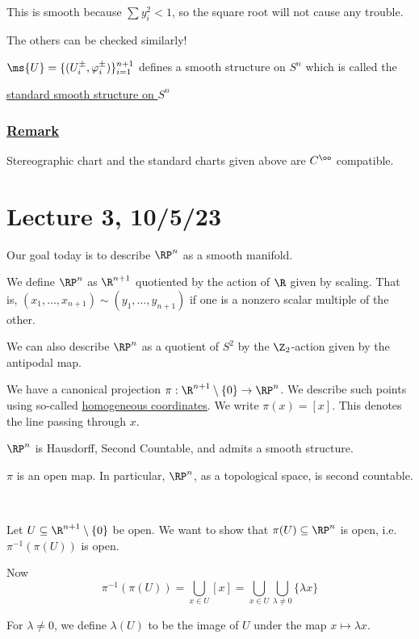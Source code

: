 \documentclass[x11names,reqno,14pt]{extarticle}
\renewcommand{\phi}{\varphi}
\begin{document}
This is smooth because $\sum y_i^2 < 1$, so the square root will not cause any trouble. 

The others can be checked similarly! 

$\ms{U} = \{(U_i^\pm, \phi_i^\pm)\}_{i=1}^{n + 1}$ defines a smooth structure on $S^n$ which is called the 

\underline{standard smooth structure on $S^n$}

\subsubsection*{\underline{Remark}}


Stereographic chart and the standard charts given above are $C^\oo$ compatible. 

\section*{Lecture 3, 10/5/23}

Our goal today is to describe $\RP^n$ as a smooth manifold. 


We define $\RP^n$ as $\R^{n + 1}$ quotiented by the action of $\R$ given by scaling. That is, $(x_1, \dots, x_{n + 1}) \sim (y_1, \dots, y_{n + 1})$ if one is a nonzero scalar multiple of the other. 

We can also describe $\RP^n$ as a quotient of $S^2$ by the $\Z_2$-action given by the antipodal map. 

We have a canonical projection $\pi:\R^{n + 1}\setminus\{0\}\to \RP^n$. We describe such points using so-called \underline{homogeneous coordinates}. We write $\pi(x) = [x]$. This denotes the line passing through $x$. 

\claim $\RP^n$ is Hausdorff, Second Countable, and admits a smooth structure. 

\lem 

$\pi$ is an open map. In particular, $\RP^n$, as a topological space, is second countable.

\proof 
\,

Let $U \subseteq \R^{n + 1} \setminus \{0\}$ be open. We want to show that $\pi(U) \subseteq \RP^n$ is open, i.e. $\pi^{-1}(\pi(U))$ is open.

Now 
\[
\pi^{-1}(\pi(U)) = \bigcup_{x\in U}[x] = \bigcup_{x\in U}\bigcup_{\lambda\neq0}\{\lambda x\}
\]

For $\lambda\neq0$, we define $\lambda(U)$ to be the image of $U$ under the map $x \mapsto \lambda x$. 
\end{document}
